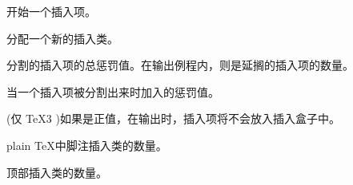 \documentclass{book}
\begin{document}
\label{cschap:insert}\label{cschap:newinsert}\label{cschap:insertpenalties}\label{cschap:floatingpenalty}\label{cschap:holdinginserts}\label{cschap:footins}\label{cschap:topins}\label{cschap:topinsert}\label{cschap:pageinsert}\label{cschap:midinsert}\label{cschap:endinsert}
\begin{inventory}
\item [\cs{insert}]
      开始一个插入项。

\item [\cs{newinsert}]
      分配一个新的插入类。

\item [\cs{insertpenalties}]
      分割的插入项的总惩罚值。在输出例程内，则是延搁的插入项的数量。

\item [\cs{floatingpenalty}]
      当一个插入项被分割出来时加入的惩罚值。

\item [\cs{holdinginserts}]
      (仅 \TeX3 )如果是正值，在输出时，插入项将不会放入插入盒子中。

\item [\cs{footins}]
      plain \TeX 中脚注插入类的数量。


\item [\cs{topins}]
      顶部插入类的数量。



\end{inventory}
\end{document}
